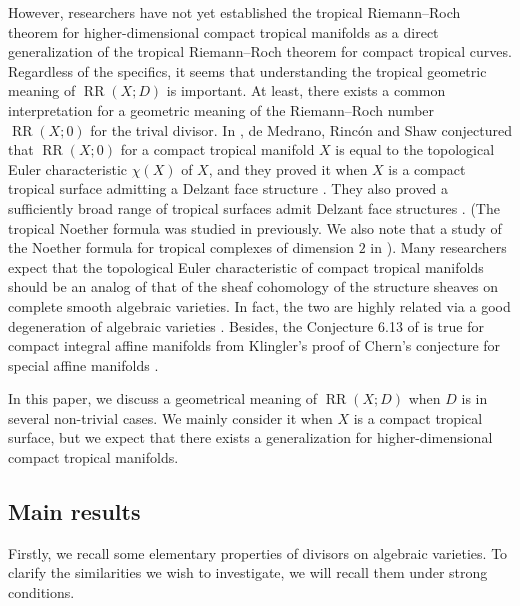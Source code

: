 \documentclass[a4paper,dvipdfmx,reqno,12pt]{amsart}
\theoremstyle{definition}
\newcommand{\opn}[1]{\operatorname{#1}}
\numberwithin{equation}{section}
\begin{document}
However, researchers have not yet established
the tropical Riemann--Roch
theorem for higher-dimensional
compact tropical manifolds
as a direct generalization of the tropical
Riemann--Roch theorem for compact tropical curves.
Regardless of the specifics, it seems that understanding
the tropical geometric meaning of $\opn{RR}(X;D)$ is 
important.
At least, there exists a common interpretation
for a geometric meaning of the Riemann--Roch number
$\opn{RR}(X;0)$ for the trival divisor.
In \cite[Conjecture 6.13]{demedrano2023chern},
de Medrano, Rinc\'on and Shaw conjectured
that $\opn{RR}(X;0)$ for a compact 
tropical manifold $X$ is equal to the 
topological Euler characteristic 
$\chi(X)$ of $X$, 
and they proved it when 
$X$ is a compact tropical surface admitting
a Delzant face structure \cite[Theorem 6.3]{demedrano2023chern}.
They also proved a sufficiently broad range of 
tropical surfaces admit Delzant face structures
\cite[Corollary 6.11]{demedrano2023chern}.
(The tropical Noether formula
was studied in \cite{shaw2015tropical} previously.
We also note that a study of the Noether
formula for tropical complexes of dimension $2$
in \cite{cartwright2015combinatorial}).
Many researchers expect that the topological Euler 
characteristic of compact tropical manifolds
should be an analog of that of the sheaf cohomology
of the structure sheaves on complete
smooth algebraic varieties.
In fact, the two are highly related 
via a good degeneration of algebraic varieties
\cite[Corollary 2]{MR3961331}.
Besides, the Conjecture 6.13 of 
\cite{demedrano2023chern} is true for 
compact integral affine manifolds
from Klingler's proof of Chern's conjecture for
special affine manifolds \cite{MR3665000}.

In this paper, we discuss
a geometrical meaning of $\opn{RR}(X;D)$
when $D$ is in several non-trivial cases.
We mainly consider it when $X$ is
a compact tropical surface, but we expect 
that there exists a generalization for
higher-dimensional compact tropical manifolds.

\subsection{Main results}

Firstly, we recall some elementary properties
of divisors on algebraic varieties. 
To clarify the similarities we wish to investigate,
we will recall them under strong conditions.
\end{document}
